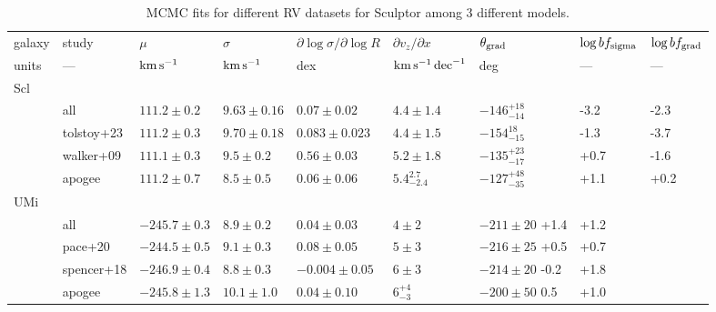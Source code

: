 \begin{landscape}
\begin{table*}[t]
\centering
\caption[Sculptor RV fits]{MCMC fits for different RV datasets for Sculptor among 3 different models. }
\label{tbl:scl_rv_mcmc}
\begin{tabular}{lllllllll}
\toprule
galaxy & study & $\mu$ & $\sigma$ & $\partial \log\sigma / \partial \log R$ & $\partial v_z / \partial x$  & $\theta_{\rm grad}$ & $\log bf_{\rm sigma}$ & $\log bf_{\rm grad}$\\
units & --- & ${\rm km\,s^{-1}}$ & ${\rm km\,s^{-1}}$ & dex & ${\rm km\,s^{-1}}\,{\rm dec}^{-1}$ & deg & --- & --- \\
\midrule
Scl \\
& all  & $111.2\pm0.2$ & $9.63\pm0.16$ & $0.07\pm0.02$ & $4.4 \pm 1.4$& $-146_{-14}^{+18}$ & -3.2 & -2.3\\
& tolstoy+23 & $111.2 \pm 0.3$ & $9.70\pm0.18$ & $0.083 \pm 0.023$ & $4.4\pm1.5$ & $-154_{-15}^{18}$ & -1.3 & -3.7 \\
& walker+09 & $111.1\pm0.3$ & $9.5\pm0.2$ & $0.56\pm0.03$ & $5.2\pm1.8$ & $-135_{-17}^{+23}$ & +0.7 & -1.6 \\
& apogee  & $111.2\pm0.7$ & $8.5\pm0.5$ & $0.06\pm0.06$ & $5.4_{-2.4}^{2.7}$ & $-127_{-35}^{+48}$ & +1.1 & +0.2 \\
\midrule
UMi \\
& all & $-245.7\pm0.3$ & $8.9\pm0.2$ & $0.04 \pm 0.03$ & $4 \pm 2$ & $-211\pm 20$ +1.4 & +1.2 \\
& pace+20 & $-244.5\pm0.5$ & $9.1\pm0.3$ & $0.08 \pm 0.05$ & $5\pm3$ & $-216 \pm 25$ +0.5 & +0.7 \\
& spencer+18 & $-246.9\pm0.4$ & $8.8\pm0.3$ & $-0.004 \pm 0.05$ & $6 \pm 3$ & $-214\pm20$ -0.2 & +1.8 \\
& apogee & $-245.8\pm1.3$ & $10.1\pm1.0$ & $0.04 \pm 0.10$ & $6_{-3}^{+4}$ & $-200\pm50$ 0.5 & +1.0 \\
\bottomrule
\end{tabular}
\end{table*}

\end{landscape}
